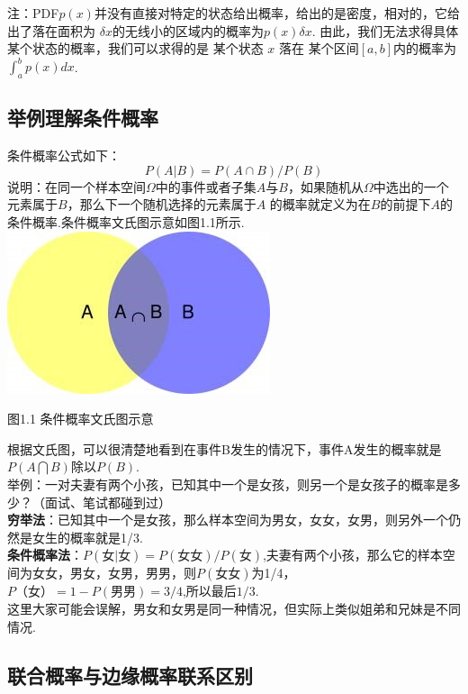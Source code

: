 注：PDF\(p(x)\)并没有直接对特定的状态给出概率，给出的是密度，相对的，它给出了落在面积为
\(δx\)的无线小的区域内的概率为$ p(x)δx$.
由此，我们无法求得具体某个状态的概率，我们可以求得的是 某个状态 \(x\)
落在 某个区间\([a,b]\)内的概率为$ \int_{a}^{b}p(x)dx$.

\subsection{举例理解条件概率}\label{ux4e3eux4f8bux7406ux89e3ux6761ux4ef6ux6982ux7387}

条件概率公式如下：
\[
P(A|B) = P(A\cap B) / P(B)
\]
说明：在同一个样本空间\(\Omega\)中的事件或者子集\(A\)与\(B\)，如果随机从\(\Omega\)中选出的一个元素属于\(B\)，那么下一个随机选择的元素属于\(A\)
的概率就定义为在\(B\)的前提下\(A\)的条件概率.条件概率文氏图示意如图1.1所示.\\
\includegraphics{./img/ch1/conditional_probability.jpg}

图1.1 条件概率文氏图示意

根据文氏图，可以很清楚地看到在事件B发生的情况下，事件A发生的概率就是\(P(A\bigcap B)\)除以\(P(B)\).\\
​举例：一对夫妻有两个小孩，已知其中一个是女孩，则另一个是女孩子的概率是多少？（面试、笔试都碰到过）\\
​\textbf{穷举法}：已知其中一个是女孩，那么样本空间为男女，女女，女男，则另外一个仍然是女生的概率就是1/3.\\
​\textbf{条件概率法}：\(P(女|女)=P(女女)/P(女)\),夫妻有两个小孩，那么它的样本空间为女女，男女，女男，男男，则\(P(女女)\)为1/4，\(P（女）= 1-P(男男)=3/4\),所以最后\(1/3\).\\
这里大家可能会误解，男女和女男是同一种情况，但实际上类似姐弟和兄妹是不同情况.

\subsection{联合概率与边缘概率联系区别}\label{ux8054ux5408ux6982ux7387ux4e0eux8fb9ux7f18ux6982ux7387ux8054ux7cfbux533aux522b}

